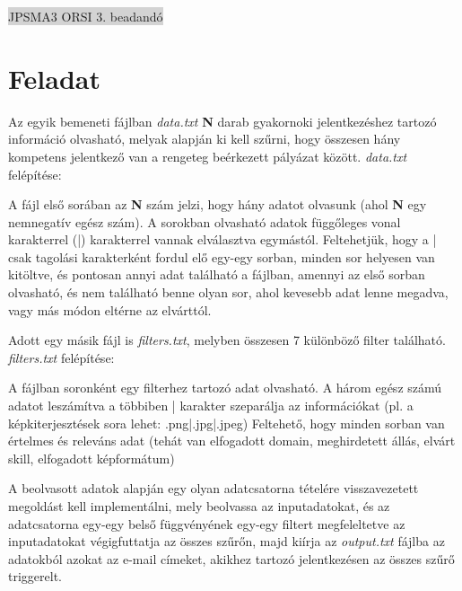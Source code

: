 \documentclass[12pt]{article}
\begin{document}
\thispagestyle{empty}
\begin{center}
	\colorbox{lightgray}{{\large JPSMA3} \hspace{4.3cm} {\large ORSI 3. beadandó} \hspace{5.7cm} \thepage}
\end{center}
\section{Feladat}


Az egyik bemeneti fájlban \textit{data.txt} \textbf{N} darab gyakornoki jelentkezéshez tartozó
információ olvasható, melyak alapján ki kell szűrni, hogy összesen hány kompetens jelentkező
van a rengeteg beérkezett pályázat között.\br
\textit{data.txt} felépítése:

A fájl első sorában az \textbf{N} szám jelzi, hogy hány adatot olvasunk (ahol \textbf{N} egy nemnegatív egész szám).
A sorokban olvasható adatok függőleges vonal karakterrel (|) karakterrel vannak elválasztva egymástól.
Feltehetjük, hogy a | csak tagolási karakterként fordul elő egy-egy sorban, minden sor
helyesen van kitöltve, és pontosan annyi adat található a fájlban, amennyi az első sorban
olvasható, és nem található benne olyan sor, ahol kevesebb adat lenne megadva, vagy más módon
eltérne az elvárttól.

Adott egy másik fájl is \textit{filters.txt}, melyben összesen 7 különböző filter található.\\
\textit{filters.txt} felépítése:

A fájlban soronként egy filterhez tartozó adat olvasható. A három egész számú adatot
leszámítva a többiben | karakter szeparálja az információkat (pl. a képkiterjesztések sora
lehet: .png|.jpg|.jpeg) Feltehető, hogy minden sorban van értelmes és releváns adat (tehát
van elfogadott domain, meghirdetett állás, elvárt skill, elfogadott képformátum)

A beolvasott adatok alapján egy olyan adatcsatorna tételére visszavezetett megoldást kell
implementálni, mely beolvassa az inputadatokat, és az adatcsatorna egy-egy belső függvényének
egy-egy filtert megfeleltetve az inputadatokat végigfuttatja az összes szűrőn, majd kiírja az
\textit{output.txt} fájlba az adatokból azokat az e-mail címeket, akikhez tartozó
jelentkezésen az összes szűrő triggerelt.
\end{document}
